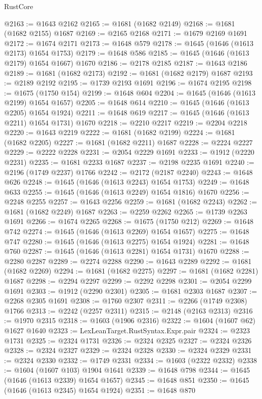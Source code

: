 \begin{lexlean}{RustCore}
\begin{coremodule}
@2163 := @1643 @2162
@2165 := @1681 (@1682 @2149)
@2168 := @1681 (@1682 @2155) @1687
@2169 := @2165 @2168
@2171 := @1679 @2169 @1691
@2172 := @1674 @2171
@2173 := @1648 @579
@2178 := @1645 (@1646 (@1613 @2173) @1654 @1753)
@2179 := @1648 @586
@2185 := @1645 (@1646 (@1613 @2179) @1654 @1667) @1670
@2186 := @2178 @2185
@2187 := @1643 @2186
@2189 := @1681 (@1682 @2173)
@2192 := @1681 (@1682 @2179) @1687
@2193 := @2189 @2192
@2195 := @1739 @2193 @1691
@2196 := @1674 @2195
@2198 := @1675 (@1750 @154)
@2199 := @1648 @604
@2204 := @1645 (@1646 (@1613 @2199) @1654 @1657)
@2205 := @1648 @614
@2210 := @1645 (@1646 (@1613 @2205) @1654 @1924)
@2211 := @1648 @619
@2217 := @1645 (@1646 (@1613 @2211) @1654 @1731) @1670
@2218 := @2210 @2217
@2219 := @2204 @2218
@2220 := @1643 @2219
@2222 := @1681 (@1682 @2199)
@2224 := @1681 (@1682 @2205)
@2227 := @1681 (@1682 @2211) @1687
@2228 := @2224 @2227
@2229 := @2222 @2228
@2231 := @2054 @2229 @1691
@2233 := @1912 (@2220 @2231)
@2235 := @1681 @2233 @1687
@2237 := @2198 @2235 @1691
@2240 := @2196 (@1749 @2237) @1766
@2242 := @2172 (@2187 @2240)
@2243 := @1648 @626
@2248 := @1645 (@1646 (@1613 @2243) @1654 @1753)
@2249 := @1648 @633
@2255 := @1645 (@1646 (@1613 @2249) @1654 @1816) @1670
@2256 := @2248 @2255
@2257 := @1643 @2256
@2259 := @1681 (@1682 @2243)
@2262 := @1681 (@1682 @2249) @1687
@2263 := @2259 @2262
@2265 := @1739 @2263 @1691
@2266 := @1674 @2265
@2268 := @1675 (@1750 @212)
@2269 := @1648 @742
@2274 := @1645 (@1646 (@1613 @2269) @1654 @1657)
@2275 := @1648 @747
@2280 := @1645 (@1646 (@1613 @2275) @1654 @1924)
@2281 := @1648 @760
@2287 := @1645 (@1646 (@1613 @2281) @1654 @1731) @1670
@2288 := @2280 @2287
@2289 := @2274 @2288
@2290 := @1643 @2289
@2292 := @1681 (@1682 @2269)
@2294 := @1681 (@1682 @2275)
@2297 := @1681 (@1682 @2281) @1687
@2298 := @2294 @2297
@2299 := @2292 @2298
@2301 := @2054 @2299 @1691
@2303 := @1912 (@2290 @2301)
@2305 := @1681 @2303 @1687
@2307 := @2268 @2305 @1691
@2308 := @1760 @2307
@2311 := @2266 (@1749 @2308) @1766
@2313 := @2242 (@2257 @2311)
@2315 := @2148 (@2163 @2313)
@2316 := @1970 @2315
@2318 := @1603 (@1906 @2316)
@2322 := @1604 (@1607 @62) @1627 @1640
@2323 := LexLeanTarget.RustSyntax.Expr.pair
@2324 := @2323 @1731
@2325 := @2324 @1731
@2326 := @2324 @2325
@2327 := @2324 @2326
@2328 := @2324 @2327
@2329 := @2324 @2328
@2330 := @2324 @2329
@2331 := @2324 @2330
@2332 := @1749 @2331
@2334 := @1603 (@2322 @2332)
@2338 := @1604 (@1607 @103) @1904 @1641
@2339 := @1648 @798
@2344 := @1645 (@1646 (@1613 @2339) @1654 @1657)
@2345 := @1648 @851
@2350 := @1645 (@1646 (@1613 @2345) @1654 @1924)
@2351 := @1648 @870

\end{coremodule}
\end{lexlean}
